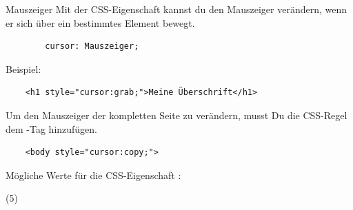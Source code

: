 \documentclass[lerntheke,12pt,a5paper,landscape]{arbeitsblatt}
\begin{document}
\begin{karte2}{Mauszeiger}
	Mit der CSS-Eigenschaft  kannst du den Mauszeiger verändern, wenn er sich über ein bestimmtes Element bewegt.
	\begin{verbatim}
		cursor: Mauszeiger;
	\end{verbatim}

	Beispiel:
	\begin{verbatim}
	<h1 style="cursor:grab;">Meine Überschrift</h1>
	\end{verbatim}

	Um den Mauszeiger der kompletten Seite zu verändern, musst Du die CSS-Regel dem -Tag hinzufügen.

	\begin{verbatim}
	<body style="cursor:copy;">
	\end{verbatim}
\end{karte2}

\begin{loesungskarte}[Mauszeiger]
	Mögliche Werte für die CSS-Eigenschaft :

	\begin{tasks}[label=](5)
		\task{}
		\task{}
		\task{}
		\task{}
		\task{}
		\task{}
		\task{}
		\task{}
		\task{}
		\task{}
		\task{}
		\task{}
		\task{}
		\task{}
		\task{}
		\task{}
		\task{}
		\task{}
		\task{}
		\task{}
		\task{}
		\task{}
		\task{}
		\task{}
		\task{}
		\task{}
		\task{}
		\task{}
		\task{}
		\task{}
		\task{}
		\task{}
		\task{}
		\task{}
		\task{}
		\task{}
		\task{}
	\end{tasks}
\end{loesungskarte}
\end{document}
